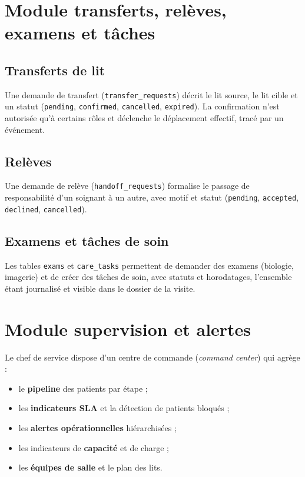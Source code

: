 \section{Module transferts, relèves, examens et tâches}

\subsection{Transferts de lit}

Une demande de transfert (\texttt{transfer\_requests}) décrit le lit source, le lit cible et un statut (\texttt{pending}, \texttt{confirmed}, \texttt{cancelled}, \texttt{expired}). La confirmation n'est autorisée qu'à certains rôles et déclenche le déplacement effectif, tracé par un événement.

\subsection{Relèves}

Une demande de relève (\texttt{handoff\_requests}) formalise le passage de responsabilité d'un soignant à un autre, avec motif et statut (\texttt{pending}, \texttt{accepted}, \texttt{declined}, \texttt{cancelled}).

\subsection{Examens et tâches de soin}

Les tables \texttt{exams} et \texttt{care\_tasks} permettent de demander des examens (biologie, imagerie) et de créer des tâches de soin, avec statuts et horodatages, l'ensemble étant journalisé et visible dans le dossier de la visite.

\section{Module supervision et alertes}

Le chef de service dispose d'un centre de commande (\textit{command center}) qui agrège :

\begin{itemize}
    \item le \textbf{pipeline} des patients par étape ;
    \item les \textbf{indicateurs SLA} et la détection de patients bloqués ;
    \item les \textbf{alertes opérationnelles} hiérarchisées ;
    \item les indicateurs de \textbf{capacité} et de charge ;
    \item les \textbf{équipes de salle} et le plan des lits.
\end{itemize}

